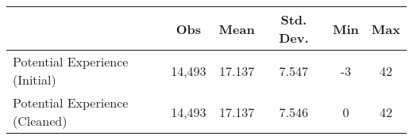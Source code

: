 {
\def\sym#1{\ifmmode^{#1}\else\(^{#1}\)\fi}
\begin{tabular}{l*{1}{ccccc}}
\hline\hline
          &      Obs&     Mean&Std. Dev.&      Min&      Max\\
\hline
Potential Experience (Initial)&   14,493&   17.137&    7.547&       -3&       42\\
Potential Experience (Cleaned)&   14,493&   17.137&    7.546&        0&       42\\
\hline\hline
\end{tabular}
}
